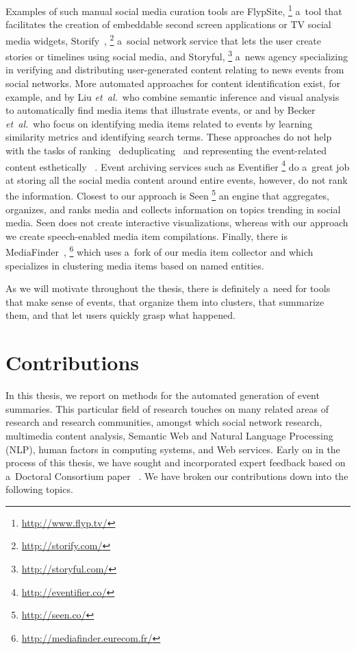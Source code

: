 Examples of such manual social media curation tools are FlypSite,%
\footnote{\url{http://www.flyp.tv/}}
a~tool that facilitates the creation of embeddable
second screen applications or TV social media widgets,
Storify~\cite{fincham2011storify,atasoy2011storify},%
\footnote{\url{http://storify.com/}}
a~social network service that lets the user create stories
or timelines using social media, and Storyful,%
\footnote{\url{http://storyful.com/}}
a~news agency specializing in verifying and distributing
user-generated content relating to news events
from social networks.
More automated approaches for content identification exist,
for example, \cite{liu2011events} and \cite{liu2011socialmedia}
by Liu \emph{et~al.}\ who combine semantic inference
and visual analysis to automatically find media items
that illustrate events, or \cite{becker2010eventidentification}
and \cite{becker2012plannedevents} by Becker \emph{et~al.}\
who focus on identifying media items related to events
by learning similarity metrics and identifying search terms.
These approaches do not help with the tasks of
ranking~\cite{liu2009learningtorank}
deduplicating~\cite{yang2009nearduplicate}
and representing the event-related content
esthetically%
~\cite{sandhaus2011photobook,obrador2012photoaesthetics}.
Event archiving services such as Eventifier%
\footnote{\url{http://eventifier.co/}} 
do a~great job at storing all the social media content around
entire events, however, do not rank the information.
Closest to our approach is Seen%
\footnote{\url{http://seen.co/}}
an engine that aggregates, organizes, and ranks media
and collects information on topics trending in social media.
Seen does not create interactive visualizations,
whereas with our approach we create
speech-enabled media item compilations.
Finally, there is MediaFinder~\cite{troncy2013mediafinder},%
\footnote{\url{http://mediafinder.eurecom.fr/}}
which uses a~fork of our media item collector
and which specializes in clustering media items
based on named entities.

As we will motivate throughout the thesis,
there is definitely a~need for tools that make sense of events,
that organize them into clusters, that summarize them,
and that let users quickly grasp what happened.

\section{Contributions}

In this thesis, we report on methods for
the automated generation of event summaries.
This particular field of research touches on many related areas
of research and research communities,
amongst which social network research, multimedia content analysis,
Semantic Web and Natural Language Processing (NLP),
human factors in computing systems,
and Web services.
Early on in the process of this thesis,
we have sought and incorporated expert feedback based on
a~Doctoral Consortium paper~%
\cite{steiner2011enrichingunstructured}.
We have broken our contributions down into
the following topics.

